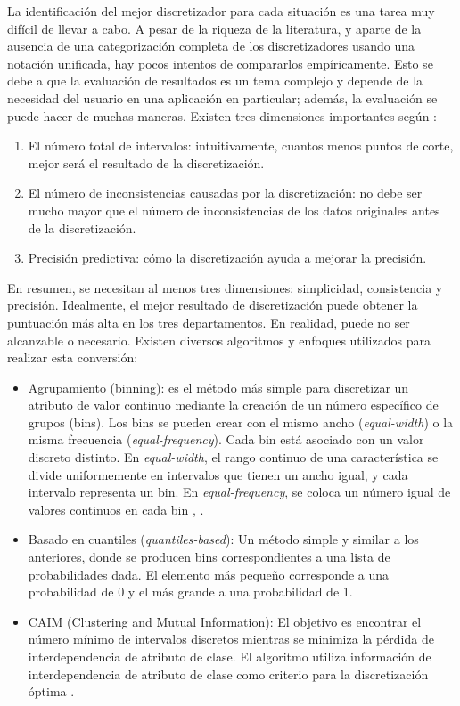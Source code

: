 La identificación del mejor discretizador para cada situación es una tarea muy difícil de llevar a cabo. A pesar de la riqueza de la literatura, y aparte de la ausencia de una categorización completa de los discretizadores usando una notación unificada, hay pocos intentos de compararlos empíricamente. Esto se debe a que la evaluación de resultados es un tema complejo y depende de la necesidad del usuario en una aplicación en particular; además, la evaluación se puede hacer de muchas maneras. Existen tres dimensiones importantes según \citep{liu2002discretization}: 
\begin{enumerate}
	\item El número total de intervalos: intuitivamente, cuantos menos puntos de corte, mejor será el resultado de la discretización.
	\item El número de inconsistencias causadas por la discretización: no debe ser mucho mayor que el número de inconsistencias de los datos originales antes de la discretización.
	\item Precisión predictiva: cómo la discretización ayuda a mejorar la precisión.
\end{enumerate}
En resumen, se necesitan al menos tres dimensiones: simplicidad, consistencia y precisión. Idealmente, el mejor resultado de discretización puede obtener la puntuación más alta en los tres departamentos. En realidad, puede no ser alcanzable o necesario. Existen diversos algoritmos y enfoques utilizados para realizar esta conversión:

\begin{itemize}
	
	\item Agrupamiento (binning): es el método más simple para discretizar un atributo de valor continuo mediante la creación de un número específico de grupos (bins). Los bins se pueden crear con el mismo ancho (\textit{equal-width}) o la misma frecuencia (\textit{equal-frequency}). Cada bin está asociado con un valor discreto distinto. En \textit{equal-width}, el rango continuo de una característica se divide uniformemente en intervalos que tienen un ancho igual, y cada intervalo representa un bin. En \textit{equal-frequency}, se coloca un número igual de valores continuos en cada bin \citep{liu2002discretization}, \citep{yang2009discretization}. 
	
	\item Basado en cuantiles (\textit{quantiles-based}): Un método simple y similar a los anteriores, donde se producen bins correspondientes a una lista de probabilidades dada. El elemento más pequeño corresponde a una probabilidad de 0 y el más grande a una probabilidad de 1. 
	
	\item CAIM (Clustering and Mutual Information): El objetivo es encontrar el número mínimo de intervalos discretos mientras se minimiza la pérdida de interdependencia de atributo de clase. El algoritmo utiliza información de interdependencia de atributo de clase como criterio para la discretización óptima \citep{kurgan2004caim}. 
	
\end{itemize}

